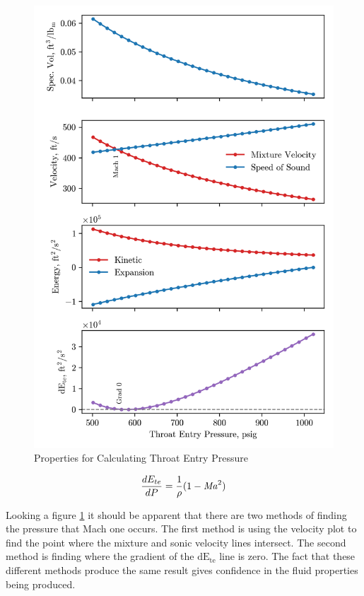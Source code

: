\documentclass[12 pt]{report}
\newcommand{\Mach}{\mbox{\textit{Ma}}}  %
\newcommand{\dete}{$\mathrm{dE_{te}}$\xspace}  %
\begin{document}
\begin{figure}
    \centering
    \includegraphics[scale=1]{figures/entry_four.png}
    \caption{Properties for Calculating Throat Entry Pressure}
    \label{fig:entr_four}
\end{figure}

\begin{equation}
\frac{dE_{te}}{dP} = \frac{1}{\rho}(1 - \Mach^2)
\label{dete_dp}
\end{equation}

Looking a figure \ref{fig:entr_four} it should be apparent that there are two methods of finding the pressure that Mach one occurs. The first method is using the velocity plot to find the point where the mixture and sonic velocity lines intersect. The second method is finding where the gradient of the \dete line is zero. The fact that these different methods produce the same result gives confidence in the fluid properties being produced.
\end{document}

